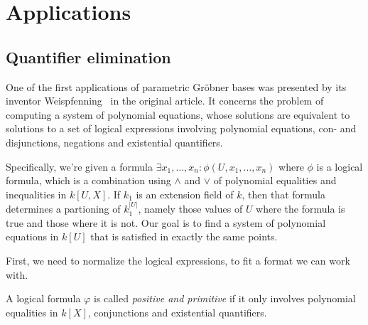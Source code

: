 \section{Applications}

\subsection{Quantifier elimination}
One of the first applications of parametric Gröbner bases was presented by its inventor Weispfenning~\cite{Weispfenning} in the original article. It concerns the problem of computing a system of polynomial equations, whose solutions are equivalent to solutions to a set of logical expressions involving polynomial equations, con- and disjunctions, negations and existential quantifiers.

Specifically, we're given a formula $\exists x_{1}, \dots, x_{n} : \phi(U, x_{1}, \dots, x_{n})$ where $\phi$ is a logical formula, which is a combination using $\land$ and $\lor$ of polynomial equalities and inequalities in $k[U, X]$. If $k_{1}$ is an extension field of $k$, then that formula determines a partioning of $k_{1}^{|U|}$, namely those values of $U$ where the formula is true and those where it is not. Our goal is to find a system of polynomial equations in $k[U]$ that is satisfied in exactly the same points.

First, we need to normalize the logical expressions, to fit a format we can work with.

\begin{definition}
  A logical formula $\varphi$ is called \textit{positive and primitive} if it only involves polynomial equalities in $k[X]$, conjunctions and existential quantifiers.
\end{definition}

